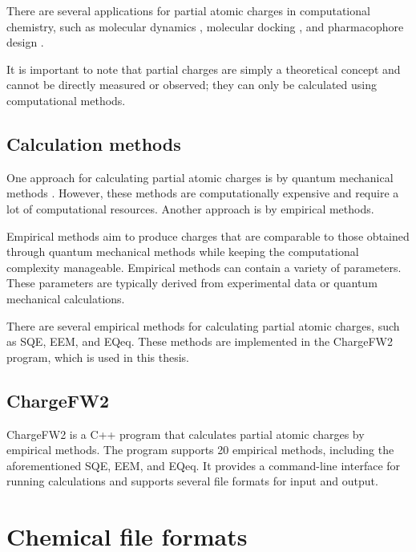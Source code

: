 \documentclass[
  digital,     %
  oneside,     %
  nosansbold,  %
  nocolorbold, %
  lof,         %
  lot,         %
]{fithesis4}
\begin{document}
There are several applications for partial atomic charges in computational chemistry, such as molecular dynamics \cite{nejad2018insulin}, molecular docking \cite{park2006critical}, and pharmacophore design \cite{stalke2011meaningful}. \cite{schindler2021thesis}

It is important to note that partial charges are simply a theoretical concept and cannot be directly measured or observed; they can only be calculated using computational methods. \cite{schindler2019thesis} 

\subsection{Calculation methods}
\label{section:calculating_partial_atomic_charges}

One approach for calculating partial atomic charges is by quantum mechanical methods \cite{gupta2015principles}. However, these methods are computationally expensive and require a lot of computational resources. Another approach is by empirical methods.

Empirical methods aim to produce charges that are comparable to those obtained through quantum mechanical methods while keeping the computational complexity manageable. Empirical methods can contain a variety of parameters. These parameters are typically derived from experimental data or quantum mechanical calculations. \cite{racek2022thesis}

There are several empirical methods for calculating partial atomic charges, such as SQE, EEM, and EQeq. \cite{schindler2021sqe} These methods are implemented in the ChargeFW2 \cite{racek2022thesis} program, which is used in this thesis.

\subsection{ChargeFW2}
\label{section:chargfw2}

ChargeFW2 is a C++ program that calculates partial atomic charges by empirical methods. The program supports 20 empirical methods, including the aforementioned SQE, EEM, and EQeq. It provides a command-line interface for running calculations and supports several file formats for input and output. \cite{racek2022thesis}

\section{Chemical file formats}
\label{section:chemical_file_formats}
\end{document}
